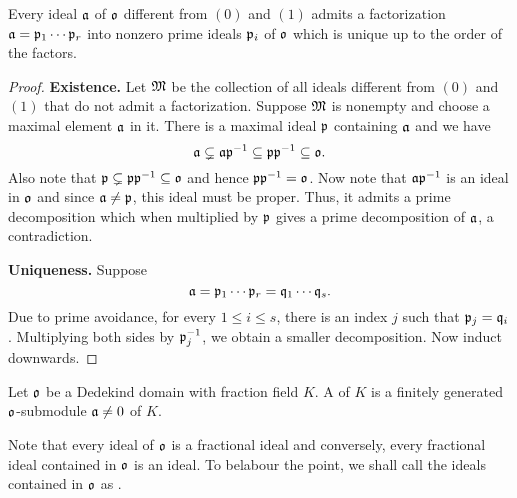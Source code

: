 \begin{theorem}
    Every ideal $\mathfrak{a}$ of $\mathfrak{o}$ different from $(0)$ and $(1)$ admits a factorization $\mathfrak{a} = \mathfrak{p}_1\cdots\mathfrak{p}_r$ into nonzero prime ideals $\mathfrak{p}_i$ of $\mathfrak{o}$ which is unique up to the order of the factors.
\end{theorem}
\begin{proof}
    \textbf{Existence.} Let $\mathfrak{M}$ be the collection of all ideals different from $(0)$ and $(1)$ that do not admit a factorization. Suppose $\mathfrak{M}$ is nonempty and choose a maximal element $\mathfrak{a}$ in it. There is a maximal ideal $\mathfrak{p}$ containing $\mathfrak{a}$ and we have 
    \begin{equation*}
        \mathfrak{a}\subsetneq\mathfrak{a}\mathfrak{p}^{-1}\subseteq\mathfrak{p}\mathfrak{p}^{-1}\subseteq\mathfrak{o}.
    \end{equation*}
    Also note that $\mathfrak{p}\subsetneq\mathfrak{p}\mathfrak{p}^{-1}\subseteq\mathfrak{o}$ and hence $\mathfrak{p}\mathfrak{p}^{-1} = \mathfrak{o}$. Now note that $\mathfrak{a}\mathfrak{p}^{-1}$ is an ideal in $\mathfrak{o}$ and since $\mathfrak{a}\ne\mathfrak{p}$, this ideal must be proper. Thus, it admits a prime decomposition which when multiplied by $\mathfrak{p}$ gives a prime decomposition of $\mathfrak{a}$, a contradiction. 

    \noindent\textbf{Uniqueness.} Suppose 
    \begin{equation*}
        \mathfrak{a} = \mathfrak{p}_1\cdots\mathfrak{p}_r = \mathfrak{q}_1\cdots\mathfrak{q}_s.
    \end{equation*}
    Due to prime avoidance, for every $1\le i\le s$, there is an index $j$ such that $\mathfrak{p}_j = \mathfrak{q}_i$. Multiplying both sides by $\mathfrak{p}_j^{-1}$, we obtain a smaller decomposition. Now induct downwards.
\end{proof}

\begin{definition}
    Let $\mathfrak{o}$ be a Dedekind domain with fraction field $K$. A  of $K$ is a finitely generated $\mathfrak{o}$-submodule $\mathfrak{a}\ne 0$ of $K$.
\end{definition}

\begin{remark}
    Note that every ideal of $\mathfrak{o}$ is a fractional ideal and conversely, every fractional ideal contained in $\mathfrak{o}$ is an ideal. To belabour the point, we shall call the ideals contained in $\mathfrak{o}$ as .
\end{remark}

